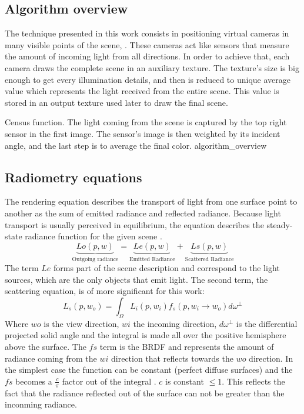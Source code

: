 \documentclass[10pt, conference]{IEEEtran}
\begin{document}
\subsection{Algorithm overview}
%
The technique presented in this work consists in positioning virtual cameras in many visible points of the scene, .
These cameras act like sensors that measure the amount of incoming light from all directions. 
In order to achieve that, each camera draws the complete scene in an auxiliary texture. 
The texture's size is big enough to get every illumination details, and then is reduced to unique average value which represents the light received from the entire scene. 
This value is stored in an output texture used later to draw the final scene. 

\subimages
	{Census function. The light coming from the scene is captured by the top right sensor in the first image. 
	The sensor's image is then weighted by its incident angle, and the last step is to average the final color.}
	{algorithm_overview}{
}

\subsection{Radiometry equations}
%
The rendering equation \cite{The_rendering_equation} describes the transport of light from one surface point to another as the sum of emitted radiance and reflected radiance. Because light transport is usually perceived in equilibrium, the equation describes the steady-state radiance function for the given scene \cite{The_rendering_equation}.
\[
	\underbrace{Lo(p,w)}_\text{Outgoing radiance} = \underbrace{Le(p,w)}_\text{Emitted Radiance} + \underbrace{Ls(p,w)}_\text{Scattered Radiance}
\]
The term $Le$ forms part of the scene description and correspond to the light sources, which are the only objects that emit light. The second term, the scattering equation, is of more significant for this work: 
\[
	L_s(p,w_o) = \int_ \Omega L_i(p,w_i)f_s(p,w_i\rightarrow w_o)d\omega^\perp
\]
Where $wo$ is the view direction, $wi$ the incoming direction, $d\omega^\perp$ is the differential projected solid angle and the integral is made all over the positive hemisphere above the surface.  The $fs$ term is the BRDF \cite{brdf} and represents the amount of radiance coming from the $wi$ direction that reflects towards the $wo$ direction. 
In the simplest case the function can be constant (perfect diffuse surfaces) and the $fs$ becomes a $\frac{c}{\pi}$ factor out of the integral \cite{perfect_diffuse_surfaces}.
$c$ is constant $\leq 1$. This reflects the fact that the radiance reflected out of the surface can not be greater than the inconming radiance.\\
\end{document}
